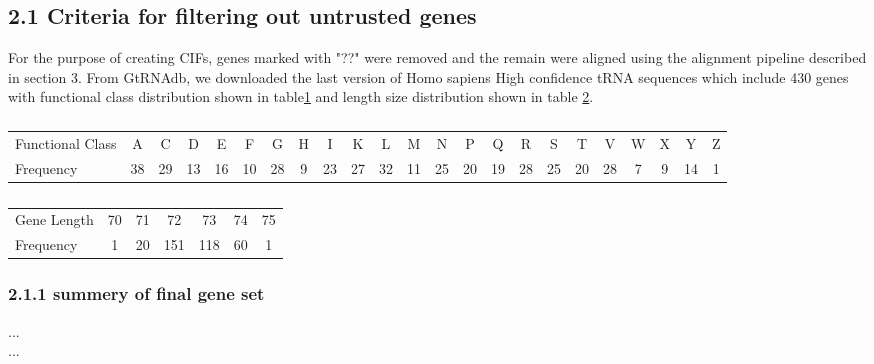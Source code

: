 \documentclass[table,
12pt, %
a4paper, %
oneside, %
headinclude,footinclude, %
BCOR5mm, %
]{scrartcl}
\begin{document}
\newpage
\subsection{2.1 Criteria for filtering out untrusted genes}
For the purpose of creating CIFs, genes marked with "??" were removed and the remain were aligned using the alignment pipeline described in section 3. 
From GtRNAdb, we downloaded the last version of Homo sapiens High confidence tRNA sequences which include 430 genes with functional class distribution shown in table\ref{table:homo1} and length size distribution shown in table \ref{table:homo2}.
\begin{table}[htbp]
  \caption{}
  \begin{adjustbox}{width=15cm,center}
    \begin{tabular}{|l|c c c c c c c c c c c c c c c c c c c c c c|}
        \hline
 Functional Class  & A&C&D&E&F&G&H&I&K&L&M&N&P&Q&R&S&T&V&W&X&Y&Z\\

Frequency &38&29&13&16&10&28&9&23&27&32&11&25&20&19&28&25&20&28&7&9&14&1\\
 \hline
    \end{tabular}
    \label{table:homo1}
  \end{adjustbox}
\end{table}


\begin{table}[htbp]
  \caption{}
  \begin{adjustbox}{width=7cm,center}
    \begin{tabular}{|l|c c c c c c|}
        \hline
Gene Length & 70  &71&72&73&74&75\\
Frequency & 1   &20& 151& 118& 60& 1\\
 \hline
    \end{tabular}
    \label{table:homo2}
  \end{adjustbox}
\end{table}

\subsubsection{2.1.1 summery of final gene set}
...\\
...
\end{document}
